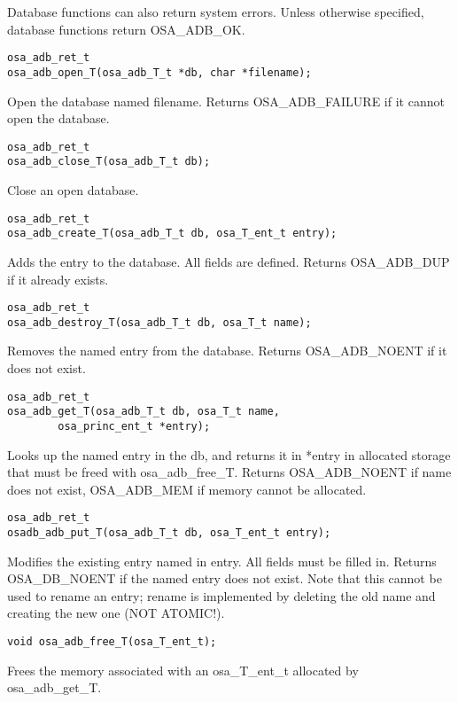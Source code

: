 Database functions can also return system errors.  Unless otherwise
specified, database functions return OSA_ADB_OK.

\begin{verbatim}
osa_adb_ret_t
osa_adb_open_T(osa_adb_T_t *db, char *filename);
\end{verbatim}
%
Open the database named filename.  Returns OSA_ADB_FAILURE if it
cannot open the database.

\begin{verbatim}
osa_adb_ret_t
osa_adb_close_T(osa_adb_T_t db);
\end{verbatim}
%
Close an open database.

\begin{verbatim}
osa_adb_ret_t
osa_adb_create_T(osa_adb_T_t db, osa_T_ent_t entry);
\end{verbatim}
%
Adds the entry to the database.  All fields are defined.  Returns
OSA_ADB_DUP if it already exists.

\begin{verbatim}
osa_adb_ret_t
osa_adb_destroy_T(osa_adb_T_t db, osa_T_t name);
\end{verbatim}

Removes the named entry from the database.  Returns OSA_ADB_NOENT if
it does not exist.

\begin{verbatim}
osa_adb_ret_t
osa_adb_get_T(osa_adb_T_t db, osa_T_t name,
        osa_princ_ent_t *entry); 
\end{verbatim}

Looks up the named entry in the db, and returns it in *entry in
allocated storage that must be freed with osa_adb_free_T.  Returns
OSA_ADB_NOENT if name does not exist, OSA_ADB_MEM if memory cannot be
allocated.

\begin{verbatim}
osa_adb_ret_t
osadb_adb_put_T(osa_adb_T_t db, osa_T_ent_t entry);
\end{verbatim}

Modifies the existing entry named in entry.  All fields must be filled
in.  Returns OSA_DB_NOENT if the named entry does not exist.  Note
that this cannot be used to rename an entry; rename is implemented by
deleting the old name and creating the new one (NOT ATOMIC!).

\begin{verbatim}
void osa_adb_free_T(osa_T_ent_t);
\end{verbatim}

Frees the memory associated with an osa_T_ent_t allocated by
osa_adb_get_T.

